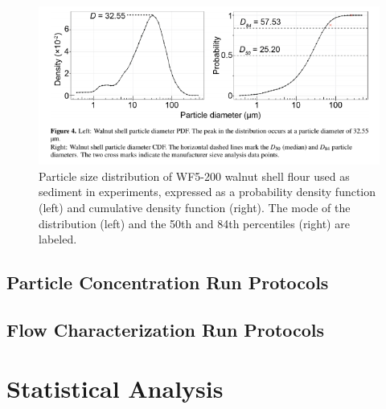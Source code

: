 \documentclass{scrreprt}
\begin{document}
\begin{figure}[htbp]
\includegraphics[width=15cm,trim = {0 3cm 0 0},clip]{wf5-200sizedist.png}
\centering
\caption{Particle size distribution of WF5-200 walnut shell flour used as sediment in experiments, expressed as a probability density function (left) and cumulative density function (right). The mode of the distribution (left) and the 50th and 84th percentiles (right) are labeled.} %
\label{fig:sedsize}
\end{figure}

\subsection{Particle Concentration Run Protocols}

\subsection{Flow Characterization Run Protocols}

\section{Statistical Analysis}




\end{document}
